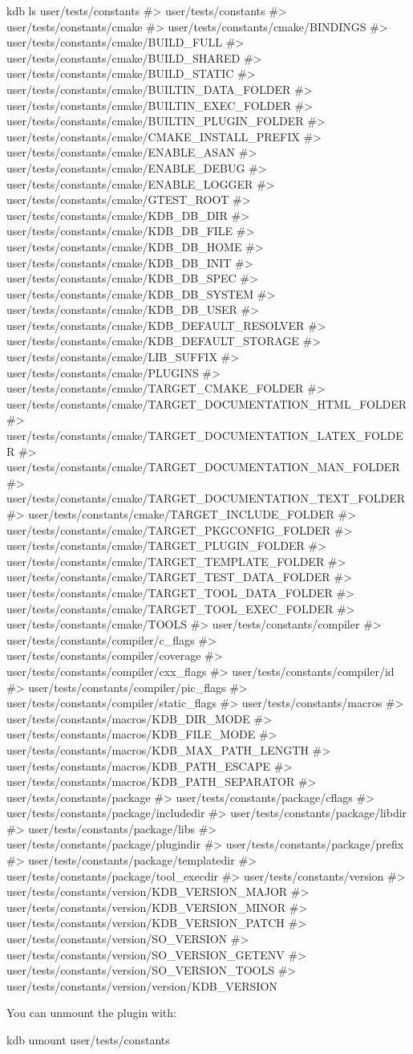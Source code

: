 \begin{DoxyCode}
kdb ls user/tests/constants
#> user/tests/constants
#> user/tests/constants/cmake
#> user/tests/constants/cmake/BINDINGS
#> user/tests/constants/cmake/BUILD\_FULL
#> user/tests/constants/cmake/BUILD\_SHARED
#> user/tests/constants/cmake/BUILD\_STATIC
#> user/tests/constants/cmake/BUILTIN\_DATA\_FOLDER
#> user/tests/constants/cmake/BUILTIN\_EXEC\_FOLDER
#> user/tests/constants/cmake/BUILTIN\_PLUGIN\_FOLDER
#> user/tests/constants/cmake/CMAKE\_INSTALL\_PREFIX
#> user/tests/constants/cmake/ENABLE\_ASAN
#> user/tests/constants/cmake/ENABLE\_DEBUG
#> user/tests/constants/cmake/ENABLE\_LOGGER
#> user/tests/constants/cmake/GTEST\_ROOT
#> user/tests/constants/cmake/KDB\_DB\_DIR
#> user/tests/constants/cmake/KDB\_DB\_FILE
#> user/tests/constants/cmake/KDB\_DB\_HOME
#> user/tests/constants/cmake/KDB\_DB\_INIT
#> user/tests/constants/cmake/KDB\_DB\_SPEC
#> user/tests/constants/cmake/KDB\_DB\_SYSTEM
#> user/tests/constants/cmake/KDB\_DB\_USER
#> user/tests/constants/cmake/KDB\_DEFAULT\_RESOLVER
#> user/tests/constants/cmake/KDB\_DEFAULT\_STORAGE
#> user/tests/constants/cmake/LIB\_SUFFIX
#> user/tests/constants/cmake/PLUGINS
#> user/tests/constants/cmake/TARGET\_CMAKE\_FOLDER
#> user/tests/constants/cmake/TARGET\_DOCUMENTATION\_HTML\_FOLDER
#> user/tests/constants/cmake/TARGET\_DOCUMENTATION\_LATEX\_FOLDER
#> user/tests/constants/cmake/TARGET\_DOCUMENTATION\_MAN\_FOLDER
#> user/tests/constants/cmake/TARGET\_DOCUMENTATION\_TEXT\_FOLDER
#> user/tests/constants/cmake/TARGET\_INCLUDE\_FOLDER
#> user/tests/constants/cmake/TARGET\_PKGCONFIG\_FOLDER
#> user/tests/constants/cmake/TARGET\_PLUGIN\_FOLDER
#> user/tests/constants/cmake/TARGET\_TEMPLATE\_FOLDER
#> user/tests/constants/cmake/TARGET\_TEST\_DATA\_FOLDER
#> user/tests/constants/cmake/TARGET\_TOOL\_DATA\_FOLDER
#> user/tests/constants/cmake/TARGET\_TOOL\_EXEC\_FOLDER
#> user/tests/constants/cmake/TOOLS
#> user/tests/constants/compiler
#> user/tests/constants/compiler/c\_flags
#> user/tests/constants/compiler/coverage
#> user/tests/constants/compiler/cxx\_flags
#> user/tests/constants/compiler/id
#> user/tests/constants/compiler/pic\_flags
#> user/tests/constants/compiler/static\_flags
#> user/tests/constants/macros
#> user/tests/constants/macros/KDB\_DIR\_MODE
#> user/tests/constants/macros/KDB\_FILE\_MODE
#> user/tests/constants/macros/KDB\_MAX\_PATH\_LENGTH
#> user/tests/constants/macros/KDB\_PATH\_ESCAPE
#> user/tests/constants/macros/KDB\_PATH\_SEPARATOR
#> user/tests/constants/package
#> user/tests/constants/package/cflags
#> user/tests/constants/package/includedir
#> user/tests/constants/package/libdir
#> user/tests/constants/package/libs
#> user/tests/constants/package/plugindir
#> user/tests/constants/package/prefix
#> user/tests/constants/package/templatedir
#> user/tests/constants/package/tool\_execdir
#> user/tests/constants/version
#> user/tests/constants/version/KDB\_VERSION\_MAJOR
#> user/tests/constants/version/KDB\_VERSION\_MINOR
#> user/tests/constants/version/KDB\_VERSION\_PATCH
#> user/tests/constants/version/SO\_VERSION
#> user/tests/constants/version/SO\_VERSION\_GETENV
#> user/tests/constants/version/SO\_VERSION\_TOOLS
#> user/tests/constants/version/version/KDB\_VERSION
\end{DoxyCode}


You can unmount the plugin with\+:


\begin{DoxyCode}
kdb umount user/tests/constants
\end{DoxyCode}
 